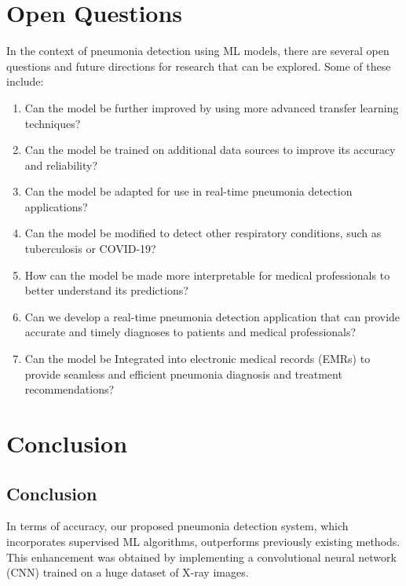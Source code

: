 %
%
%


\chapter{Open Questions}

In the context of pneumonia detection using ML models, there are several open questions and future directions for research that can be explored. Some of these include:

\begin{enumerate}
	\item Can the model be further improved by using more advanced transfer learning techniques?
	\item Can the model be trained on additional data sources to improve its accuracy and reliability?
	\item Can the model be adapted for use in real-time pneumonia detection applications?
	\item Can the model be modified to detect other respiratory conditions, such as tuberculosis or COVID-19?
	\item How can the model be made more interpretable for medical professionals to better understand its predictions?
	\item Can we develop a real-time pneumonia detection application that can provide accurate and timely diagnoses to patients and medical professionals?
	\item  Can the model be Integrated into electronic medical records (EMRs) to provide seamless and efficient pneumonia diagnosis and treatment recommendations?
\end{enumerate}

\chapter{Conclusion}

\section{Conclusion}

In terms of accuracy, our proposed pneumonia detection system, which incorporates supervised ML algorithms, outperforms previously existing methods. This enhancement was obtained by implementing a convolutional neural network (CNN) trained on a huge dataset of X-ray images.\\

